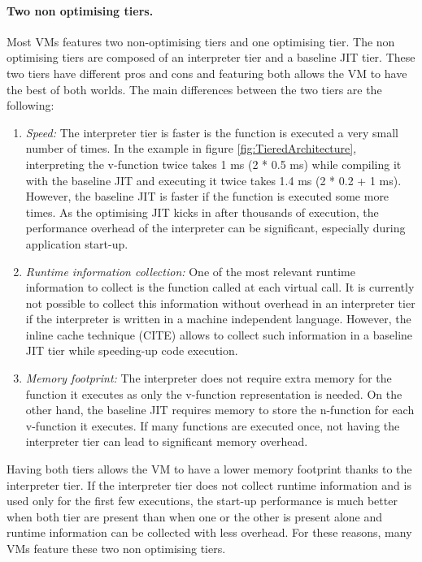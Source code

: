 \documentclass[a4paper,12pt,twoside]{../includes/ThesisStyle}
\begin{document}
\paragraph{Two non optimising tiers.}Most VMs features two non-optimising tiers and one optimising tier. The non optimising tiers are composed of an interpreter tier and a baseline JIT tier. These two tiers have different pros and cons and featuring both allows the VM to have the best of both worlds. The main differences between the two tiers are the following:

\begin{enumerate}
	\item \emph{Speed: } The interpreter tier is faster is the function is executed a very small number of times. In the example in figure \ref{fig:TieredArchitecture}, interpreting the v-function twice takes 1 ms (2 * 0.5 ms) while compiling it with the baseline JIT and executing it twice takes 1.4 ms (2 * 0.2 + 1 ms). However, the baseline JIT is faster if the function is executed some more times. As the optimising JIT kicks in after thousands of execution, the performance overhead of the interpreter can be significant, especially during application start-up.
	\item \emph{Runtime information collection: }One of the most relevant runtime information to collect is the function called at each virtual call. It is currently not possible to collect this information without overhead in an interpreter tier if the interpreter is written in a machine independent language. However, the inline cache technique (CITE) allows to collect such information in a baseline JIT tier while speeding-up code execution.
	\item \emph{Memory footprint: }The interpreter does not require extra memory for the function it executes as only the v-function representation is needed. On the other hand, the baseline JIT requires memory to store the n-function for each v-function it executes. If many functions are executed once, not having the interpreter tier can lead to significant memory overhead.
\end{enumerate}
Having both tiers allows the VM to have a lower memory footprint thanks to the interpreter tier. If the interpreter tier does not collect runtime information and is used only for the first few executions, the start-up performance is much better when both tier are present than when one or the other is present alone and runtime information can be collected with less overhead. For these reasons, many VMs feature these two non optimising tiers. 
\end{document}

